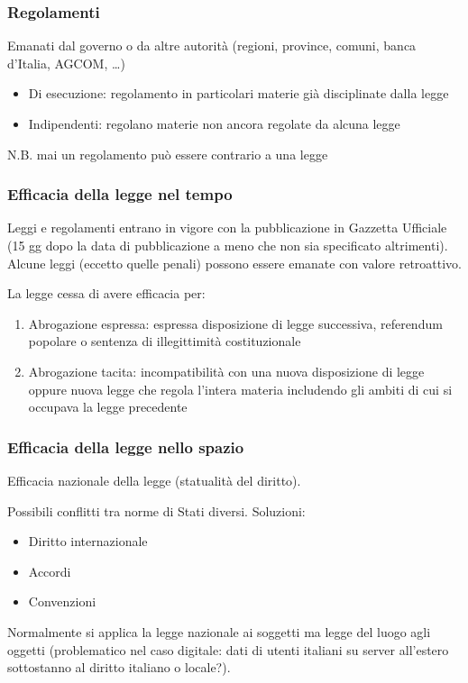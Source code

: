\subsubsection{Regolamenti}
Emanati dal governo o da altre autorità (regioni, province, comuni, banca d'Italia, AGCOM, …)
\begin{itemize}
    \item Di esecuzione: regolamento in particolari materie già disciplinate dalla legge
    \item Indipendenti: regolano materie non ancora regolate da alcuna legge
\end{itemize}

N.B. mai un regolamento può essere contrario a una legge

\subsubsection{Efficacia della legge nel tempo}
Leggi e regolamenti entrano in vigore con la pubblicazione in Gazzetta Ufficiale (15 gg dopo la data di pubblicazione a meno che non sia specificato altrimenti). Alcune leggi (eccetto quelle penali) possono essere emanate con valore retroattivo. 

La legge cessa di avere efficacia per:
\begin{enumerate}
    \item Abrogazione espressa: espressa disposizione di legge successiva, referendum popolare o sentenza di illegittimità costituzionale
    \item Abrogazione tacita: incompatibilità con una nuova disposizione di legge oppure nuova legge che regola l'intera materia includendo gli ambiti di cui si occupava la legge precedente
\end{enumerate}

\subsubsection{Efficacia della legge nello spazio}
Efficacia nazionale della legge (statualità del diritto).

Possibili conflitti tra norme di Stati diversi. Soluzioni:
\begin{itemize}
    \item Diritto internazionale
    \item Accordi
    \item Convenzioni
\end{itemize}

Normalmente si applica la legge nazionale ai soggetti ma legge del luogo agli oggetti (problematico nel caso digitale: dati di utenti italiani su server all'estero sottostanno al diritto italiano o locale?).

